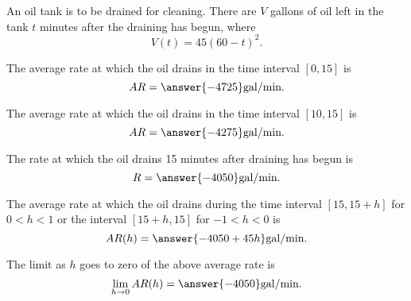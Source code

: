 \documentclass{ximera}
\author{Nela Lakos \and Kyle Parsons}
\begin{document}
\begin{exercise}

An oil tank is to be drained for cleaning.  There are $V$ gallons of oil left in the tank $t$ minutes after the draining has begun, where 
\[
V(t) = 45(60-t)^2.
\]

The average rate at which the oil drains in the time interval $\left[0,15\right]$ is
\[
AR = \answer{-4725}\text{gal/min}.
\]

The average rate at which the oil drains in the time interval $\left[10,15\right]$ is
\[
AR = \answer{-4275}\text{gal/min}.
\]

The rate at which the oil drains 15 minutes after draining has begun is
\[
R = \answer{-4050}\text{gal/min}.
\]

The average rate at which the oil drains during the time interval $\left[15,15+h\right]$ for $0<h<1$ or the interval $\left[15+h,15\right]$ for $-1<h<0$ is
\[
AR(h) = \answer{-4050 + 45h}\text{gal/min}.
\]

The limit as $h$ goes to zero of the above average rate is
\[
\lim_{h\to0}AR(h) = \answer{-4050}\text{gal/min}.
\]

\end{exercise}
\end{document}
